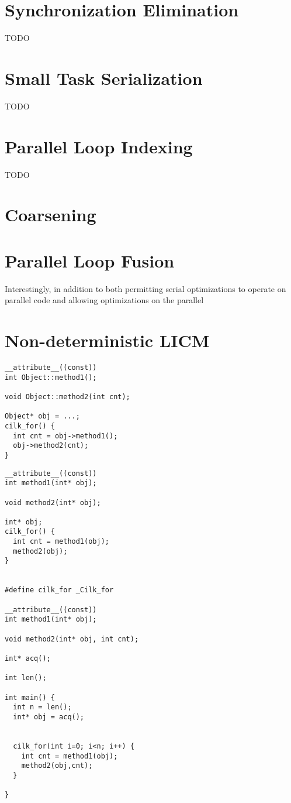 

\section{Synchronization Elimination}

TODO

\section{Small Task Serialization}

TODO

\section{Parallel Loop Indexing}

TODO

\section{Coarsening}


\section{Parallel Loop Fusion}
Interestingly, in addition to both permitting serial optimizations to operate on parallel code and allowing optimizations on the parallel 


\section{Non-deterministic LICM}
\begin{verbatim}
__attribute__((const))
int Object::method1();

void Object::method2(int cnt);

Object* obj = ...;
cilk_for() {
  int cnt = obj->method1();
  obj->method2(cnt);
}

\end{verbatim}

\begin{verbatim}
__attribute__((const))
int method1(int* obj);

void method2(int* obj);

int* obj;
cilk_for() {
  int cnt = method1(obj);
  method2(obj);
}


#define cilk_for _Cilk_for

__attribute__((const))
int method1(int* obj);

void method2(int* obj, int cnt);

int* acq();

int len();

int main() {
  int n = len();
  int* obj = acq();


  cilk_for(int i=0; i<n; i++) {
    int cnt = method1(obj);
    method2(obj,cnt);
  }

}
\end{verbatim}

